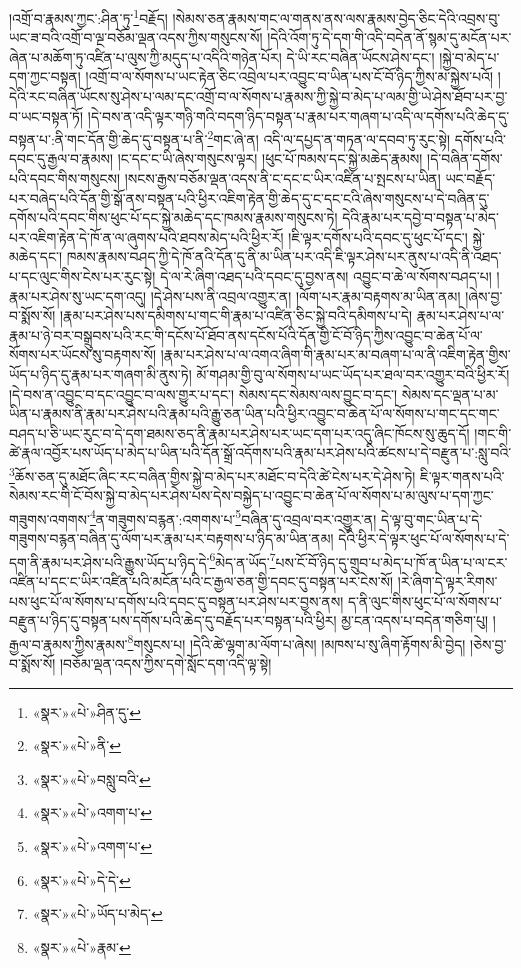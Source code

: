 །འགྲོ་བ་རྣམས་ཀྱང་:ཤིན་ཏུ་\footnote{«སྣར་»«པེ་»ཤིན་དུ་}བརྗོད། །སེམས་ཅན་རྣམས་གང་ལ་གནས་ནས་ལས་རྣམས་བྱེད་ཅིང་དེའི་འབྲས་བུ་ཡང་ཟ་བའི་འགྲོ་བ་ལྔ་བཅོམ་ལྡན་འདས་ཀྱིས་གསུངས་སོ། །དེའི་འོག་ཏུ་དེ་དག་གི་འདི་བདེན་ནོ་སྙམ་དུ་མངོན་པར་ཞེན་པ་མཆོག་ཏུ་འཛིན་པ་ལུས་ཀྱི་མདུད་པ་འདིའི་གཉེན་པོར། དེ་ཡི་རང་བཞིན་ཡོངས་ཤེས་དང་། །སྐྱེ་བ་མེད་པ་དག་ཀྱང་བསྟན། །འགྲོ་བ་ལ་སོགས་པ་ཡང་རྟེན་ཅིང་འབྲེལ་པར་འབྱུང་བ་ཡིན་པས་ངོ་བོ་ཉིད་ཀྱིས་མ་སྐྱེས་པའོ། །དེའི་རང་བཞིན་ཡོངས་སུ་ཤེས་པ་ལམ་དང་འགྲོ་བ་ལ་སོགས་པ་རྣམས་ཀྱི་སྐྱེ་བ་མེད་པ་ལམ་གྱི་ཡེ་ཤེས་ཐོབ་པར་བྱ་བ་ཡང་བསྟན་ཏོ། །དེ་བས་ན་འདི་ལྟར་གཉི་གའི་བདག་ཉིད་བསྟན་པ་རྣམ་པར་གཞག་པ་འདི་ལ་དགོས་པའི་ཆེད་དུ་བསྟན་པ་:ནི་གང་དོན་གྱི་ཆེད་དུ་བསྟན་པ་ནི་\footnote{«སྣར་»«པེ་»ནི་}གང་ཞེ་ན། འདི་ལ་དཔྱད་ན་གཏན་ལ་དབབ་ཏུ་རུང་སྟེ། དགོས་པའི་དབང་དུ་རྒྱལ་བ་རྣམས། །ང་དང་ང་ཡི་ཞེས་གསུངས་ལྟར། །ཕུང་པོ་ཁམས་དང་སྐྱེ་མཆེད་རྣམས། །དེ་བཞིན་དགོས་པའི་དབང་གིས་གསུངས། །སངས་རྒྱས་བཅོམ་ལྡན་འདས་ནི་ང་དང་ང་ཡིར་འཛིན་པ་སྤངས་པ་ཡིན། ཡང་བརྗོད་པར་བཞེད་པའི་དོན་གྱི་སྒོ་ནས་བསྟན་པའི་ཕྱིར་འཇིག་རྟེན་གྱི་ཆེད་དུ་ང་དང་ངའི་ཞེས་གསུངས་པ་དེ་བཞིན་དུ་དགོས་པའི་དབང་གིས་ཕུང་པོ་དང་སྐྱེ་མཆེད་དང་ཁམས་རྣམས་གསུངས་ཏེ། དེའི་རྣམ་པར་དབྱེ་བ་བསྟན་པ་མེད་པར་འཇིག་རྟེན་དེ་ཁོ་ན་ལ་ཞུགས་པའི་ཐབས་མེད་པའི་ཕྱིར་རོ། །ཇི་ལྟར་དགོས་པའི་དབང་དུ་ཕུང་པོ་དང་། སྐྱེ་མཆེད་དང་། ཁམས་རྣམས་བཤད་ཀྱི་དེ་ཁོ་ནའི་དོན་དུ་ནི་མ་ཡིན་པར་འདི་ཇི་ལྟར་ཤེས་པར་ནུས་པ་འདི་ནི་འཐད་པ་དང་ལུང་གིས་ངེས་པར་རུང་སྟེ། དེ་ལ་རེ་ཞིག་འཐད་པའི་དབང་དུ་བྱས་ནས། འབྱུང་བ་ཆེ་ལ་སོགས་བཤད་པ། །རྣམ་པར་ཤེས་སུ་ཡང་དག་འདུ། །དེ་ཤེས་པས་ནི་འབྲལ་འགྱུར་ན། །ལོག་པར་རྣམ་བརྟགས་མ་ཡིན་ནམ། །ཞེས་བྱ་བ་སྨོས་སོ། །རྣམ་པར་ཤེས་པས་དམིགས་པ་གང་གི་རྣམ་པ་འཛིན་ཅིང་སྐྱེ་བའི་དམིགས་པ་དེ། རྣམ་པར་ཤེས་པ་ལ་རྣམ་པ་ཉེ་བར་བསྒྲུབས་པའི་རང་གི་དངོས་པོ་ཐོབ་ནས་དངོས་པོའི་དོན་གྱི་ངོ་བོ་ཉིད་ཀྱིས་འབྱུང་བ་ཆེན་པོ་ལ་སོགས་པར་ཡོངས་སུ་བརྟགས་སོ། །རྣམ་པར་ཤེས་པ་ལ་འགའ་ཞིག་གི་རྣམ་པར་མ་བཞག་པ་ལ་ནི་འཇིག་རྟེན་གྱིས་ཡོད་པ་ཉིད་དུ་རྣམ་པར་གཞག་མི་ནུས་ཏེ། མོ་གཤམ་གྱི་བུ་ལ་སོགས་པ་ཡང་ཡོད་པར་ཐལ་བར་འགྱུར་བའི་ཕྱིར་རོ། །དེ་བས་ན་འབྱུང་བ་དང་འབྱུང་བ་ལས་གྱུར་པ་དང་། སེམས་དང་སེམས་ལས་བྱུང་བ་དང་། སེམས་དང་ལྡན་པ་མ་ཡིན་པ་རྣམས་ནི་རྣམ་པར་ཤེས་པའི་རྣམ་པའི་རྒྱུ་ཅན་ཡིན་པའི་ཕྱིར་འབྱུང་བ་ཆེན་པོ་ལ་སོགས་པ་གང་དང་གང་བཤད་པ་ཅི་ཡང་རུང་བ་དེ་དག་ཐམས་ཅད་ནི་རྣམ་པར་ཤེས་པར་ཡང་དག་པར་འདུ་ཞིང་ཁོངས་སུ་ཆུད་དོ། །གང་གི་ཚེ་རྣལ་འབྱོར་པས་ཡོད་པ་མེད་པ་ཡིན་པའི་དོན་སྒྲོ་འདོགས་པའི་རྣམ་པར་ཤེས་པའི་ཚངས་པ་དེ་བརྫུན་པ་:སླུ་བའི་\footnote{«སྣར་»«པེ་»བསླུ་བའི་}ཆོས་ཅན་དུ་མཐོང་ཞིང་རང་བཞིན་གྱིས་སྐྱེ་བ་མེད་པར་མཐོང་བ་དེའི་ཚེ་ངེས་པར་དེ་ཤེས་ཏེ། ཇི་ལྟར་གནས་པའི་སེམས་རང་གི་ངོ་བོས་སྐྱེ་བ་མེད་པར་ཤེས་པས་དེས་བསྐྱེད་པ་འབྱུང་བ་ཆེན་པོ་ལ་སོགས་པ་མ་ལུས་པ་དག་ཀྱང་གཟུགས་འགགས་\footnote{«སྣར་»«པེ་»འགག་པ་}ན་གཟུགས་བརྙན་:འགགས་པ་\footnote{«སྣར་»«པེ་»འགག་པ་}བཞིན་དུ་འབྲལ་བར་འགྱུར་ན། དེ་ལྟ་བུ་གང་ཡིན་པ་དེ་གཟུགས་བརྙན་བཞིན་དུ་ལོག་པར་རྣམ་པར་བརྟགས་པ་ཉིད་མ་ཡིན་ནམ། དེའི་ཕྱིར་དེ་ལྟར་ཕུང་པོ་ལ་སོགས་པ་དེ་དག་ནི་རྣམ་པར་ཤེས་པའི་རྒྱུས་ཡོད་པ་ཉིད་དེ་\footnote{«སྣར་»«པེ་»དེ་དེ་}མེད་ན་ཡོད་\footnote{«སྣར་»«པེ་»ཡོད་པ་མེད་}པས་ངོ་བོ་ཉིད་དུ་གྲུབ་པ་མེད་པ་ཁོ་ན་ཡིན་པ་ལ་ངར་འཛིན་པ་དང་ང་ཡིར་འཛིན་པའི་མངོན་པའི་ང་རྒྱལ་ཅན་གྱི་དབང་དུ་བསྟན་པར་ངེས་སོ། །རེ་ཞིག་དེ་ལྟར་རིགས་པས་ཕུང་པོ་ལ་སོགས་པ་དགོས་པའི་དབང་དུ་བསྟན་པར་ཤེས་པར་བྱས་ནས། ད་ནི་ལུང་གིས་ཕུང་པོ་ལ་སོགས་པ་བརྫུན་པ་ཉིད་དུ་བསྟན་པས་དགོས་པའི་ཆེད་དུ་བརྗོད་པར་བསྟན་པའི་ཕྱིར། མྱ་ངན་འདས་པ་བདེན་གཅིག་པུ། །རྒྱལ་བ་རྣམས་ཀྱིས་རྣམས་\footnote{«སྣར་»«པེ་»རྣམ་}གསུངས་པ། །དེའི་ཚེ་ལྷག་མ་ལོག་པ་ཞེས། །མཁས་པ་སུ་ཞིག་རྟོགས་མི་བྱེད། །ཅེས་བྱ་བ་སྨོས་སོ། །བཅོམ་ལྡན་འདས་ཀྱིས་དགེ་སློང་དག་འདི་ལྟ་སྟེ། 